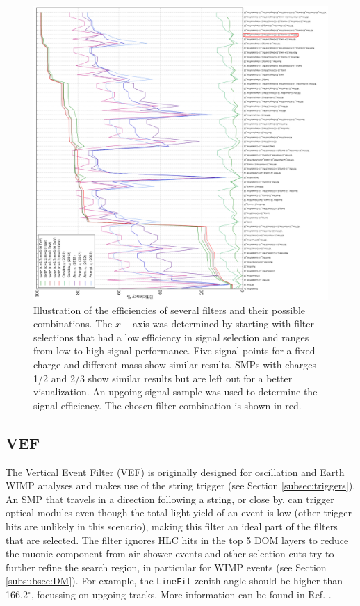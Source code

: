 \begin{figure}
\centering
\includegraphics[width=\textwidth,height=0.85\textheight]{chapter8/img/FilterRate_better_rotated}
\caption{Illustration of the efficiencies of several filters and their possible combinations. The $x-$axis was determined by starting with filter selections that had a low efficiency in signal selection and ranges from low to high signal performance. Five signal points for a fixed charge and different mass show similar results. SMPs with charges 1/2 and 2/3 show similar results but are left out for a better visualization. An upgoing signal sample was used to determine the signal efficiency. The chosen filter combination is shown in red.}
\label{fig:filterrate}
\end{figure}

\subsection{VEF}
The Vertical Event Filter (VEF) is originally designed for oscillation and Earth WIMP analyses and makes use of the string trigger (see Section \ref{subsec:triggers}). An SMP that travels in a direction following a string, or close by, can trigger optical modules even though the total light yield of an event is low (other trigger hits are unlikely in this scenario), making this filter an ideal part of the filters that are selected. The filter ignores HLC hits in the top 5 DOM layers to reduce the muonic component from air shower events and other selection cuts try to further refine the search region, in particular for WIMP events (see Section \ref{subsubsec:DM}). For example, the \texttt{LineFit} zenith angle should be higher than 166.2$^\circ$, focussing on upgoing tracks. More information can be found in Ref. \cite{VEF2012}.

